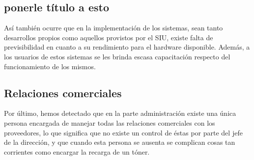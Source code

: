 \documentclass[a4paper,11pt,oneside]{article}
\begin{document}


\subsection*{ponerle título a esto}
Así también ocurre que en la implementación de los sistemas, sean
tanto desarrollos propios como aquellos provistos por el SIU, existe
falta de previsibilidad en cuanto a su rendimiento para el hardware
disponible. Además, a los usuarios de estos sistemas se les brinda
escasa capacitación respecto del funcionamiento de los mismos.%
%
\subsection*{Relaciones comerciales}
Por último, hemos detectado que en la parte administración existe una
única persona encargada de manejar todas las relaciones comerciales
con los proveedores, lo que significa que no existe un control de
éstas por parte del jefe de la dirección, y que cuando esta persona se
ausenta se complican cosas tan corrientes como encargar la recarga de
un tóner.
\end{document}
